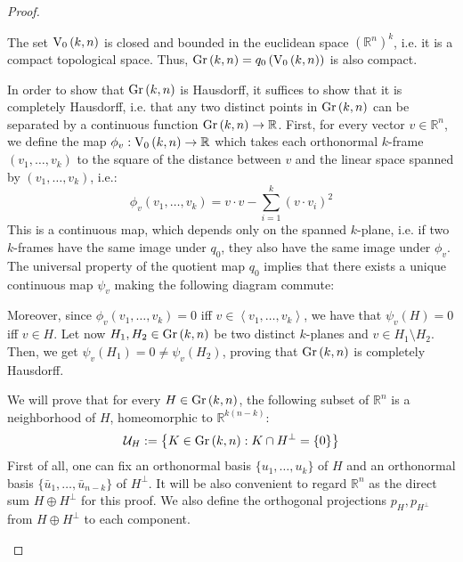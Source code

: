 \begin{proof} \begin{b_item}
\item The set $\StO{k}{n}$ is closed and bounded in the euclidean space $\left(\mathbb{R}^n\right)^k$, i.e. it is a compact topological space. Thus, $\Gr{k}{n}=q_0\left(\StO{k}{n}\right)$ is also compact.
\item In order to show that $\Gr{k}{n}$ is Hausdorff, it suffices to show that it is completely Hausdorff, i.e. that any two distinct points in $\Gr{k}{n}$ can be separated by a continuous function $\Gr{k}{n}\to\mathbb{R}$. First, for every vector $v\in\mathbb{R}^n$, we define the map $\phi_v:\StO{k}{n}\to\mathbb{R}$ which takes each orthonormal $k$-frame $(v_1,\ldots,v_k)$ to the square of the distance between $v$ and the linear space spanned by $(v_1,\ldots,v_k)$, i.e.:
$$\phi_v(v_1,\ldots,v_k)=v\cdot v-\sum_{i=1}^k\left(v\cdot v_i\right)^2$$
This is a continuous map, which depends only on the spanned $k$-plane, i.e. if two $k$-frames have the same image under $q_0$, they also have the same image under $\phi_v$. The universal property of the quotient map $q_0$ implies that there exists a unique continuous map $\psi_v$ making the following diagram commute:

\begin{center}
\end{center}

Moreover, since $\phi_v(v_1,\ldots,v_k)=0$ iff $v\in\left<v_1,\ldots,v_k\right>$, we have that $\psi_v(H)=0$ iff $v\in H$. Let now $H_1,H_2\in\Gr{k}{n}$ be two distinct $k$-planes and $v\in H_1\setminus H_2$. Then, we get $\psi_v(H_1)=0\neq\psi_v(H_2)$, proving that $\Gr{k}{n}$ is completely Hausdorff.


\item We will prove that for every $H\in\Gr{k}{n}$, the following subset of $\mathbb{R}^n$ is a neighborhood of $H$, homeomorphic to $\mathbb{R}^{k(n-k)}$:
$$\mathcal{U}_H:=\left\{K\in\Gr{k}{n}:K\cap H^{\perp}=\{0\}\right\}$$
First of all, one can fix an orthonormal basis $\{u_1,\ldots,u_k\}$ of $H$ and an orthonormal basis $\{\bar{u}_1,\ldots,\bar{u}_{n-k}\}$ of $H^{\perp}$. It will be also convenient to regard $\mathbb{R}^n$ as the direct sum $H\oplus H^{\perp}$ for this proof. We also define the orthogonal projections $p_H,p_{H^{\perp}}$ from $H\oplus H^{\perp}$ to each component.


\end{b_item}
\end{proof}
